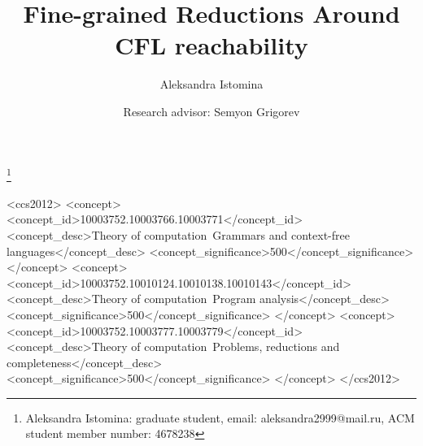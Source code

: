 \documentclass[acmsmall,nonacm]{acmart}
\begin{document}
	
	\title{Fine-grained Reductions Around CFL reachability}
	
	\author{Aleksandra Istomina}
	\thanks{Aleksandra Istomina: graduate student, email: aleksandra2999@mail.ru, ACM student member number: 4678238}
	
	\author{Research advisor: Semyon Grigorev}
	
	\newcommand\todo[1]{{\color{violet}#1}}
	\newcommand\db[1]{{\color{red}#1}}
	\newcommand\question[1]{{\color{cyan}#1}}
	
	
	
	
	\begin{CCSXML}
		<ccs2012>
		<concept>
		<concept_id>10003752.10003766.10003771</concept_id>
		<concept_desc>Theory of computation~Grammars and context-free languages</concept_desc>
		<concept_significance>500</concept_significance>
		</concept>
		<concept>
		<concept_id>10003752.10010124.10010138.10010143</concept_id>
		<concept_desc>Theory of computation~Program analysis</concept_desc>
		<concept_significance>500</concept_significance>
		</concept>
		<concept>
		<concept_id>10003752.10003777.10003779</concept_id>
		<concept_desc>Theory of computation~Problems, reductions and completeness</concept_desc>
		<concept_significance>500</concept_significance>
		</concept>
		</ccs2012>
	\end{CCSXML}
	
\end{document}
